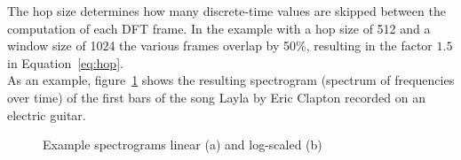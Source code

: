 \noindent The hop size determines how many discrete-time values are skipped between the computation of each DFT frame. In the example with a hop size of 512 and a window size of 1024 the various frames overlap by 50\%, resulting in the factor $1.5$ in Equation~\eqref{eq:hop}.\\
\noindent As an example, figure~\ref{laylaspec} shows the resulting spectrogram (spectrum of frequencies over time) of the first bars of the song Layla by Eric Clapton recorded on an electric guitar.\\ 
\begin{figure}[htbp]
	\centering
	\begin{subfigure}{0.5\textwidth}
		\centering
		\label{laylaspec}
	\end{subfigure}%
	\begin{subfigure}{0.5\textwidth}
		\centering
		\label{laylaspecfft}
	\end{subfigure}
	\caption{Example spectrograms linear (a) and log-scaled (b)}
	\label{fig:test}
\end{figure}
